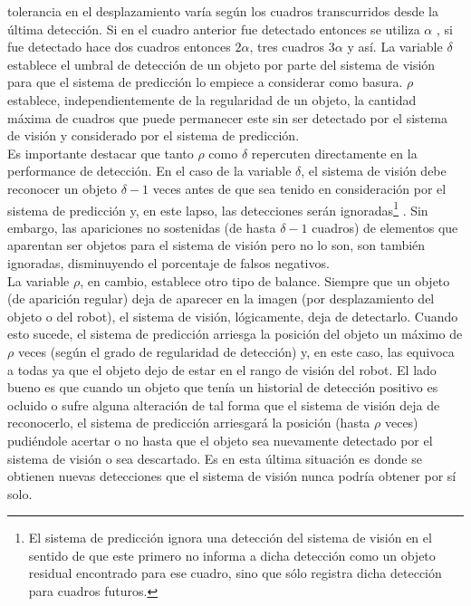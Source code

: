 tolerancia en el desplazamiento varía según los cuadros transcurridos desde la última 
detección. Si en el cuadro anterior fue detectado entonces se utiliza 
$\alpha$ , si fue detectado hace dos cuadros entonces $2\alpha$, tres 
cuadros $3\alpha$ y así. La variable $\delta$ establece el umbral de 
detección de un objeto por parte del sistema de visión para que el 
sistema de predicción lo empiece  a considerar como basura. $\rho$ establece, 
independientemente de la  
regularidad de un objeto, la cantidad máxima de cuadros que puede 
permanecer este sin ser detectado por el sistema de visión y 
considerado por el sistema de predicción. \\ 
\indent Es importante destacar que tanto $\rho$ como $\delta$ repercuten directamente en la 
performance de detección. En el caso de la variable $\delta$, el 
sistema de visión debe reconocer un objeto $\delta -1$ veces antes de que sea 
tenido en consideración por el sistema de predicción y, en este lapso, las 
detecciones serán ignoradas\footnote{El sistema de predicción ignora 
una detección del sistema de visión en el sentido de que este primero 
no informa a dicha detección como un objeto residual encontrado para 
ese cuadro, sino que sólo registra dicha detección para 
cuadros futuros.} . Sin embargo, las apariciones no sostenidas 
(de hasta $\delta -1$ cuadros) de elementos que aparentan ser objetos 
para el sistema de visión pero no lo son, son también ignoradas, 
disminuyendo el porcentaje de falsos negativos.\\
\indent La variable $\rho$, en cambio, establece otro tipo de balance. 
	Siempre que un objeto (de aparición regular) deja de aparecer en la imagen (por 
	desplazamiento del objeto o del robot), el sistema de visión, 
	lógicamente, deja de detectarlo. Cuando esto sucede, el sistema de 
	predicción arriesga la posición del objeto un máximo de $\rho$ veces 
	(según el grado de regularidad de detección) y, en este caso, las equivoca a 
	todas ya que el objeto dejo de estar en el rango de visión del 
	robot. El lado bueno es que cuando un objeto que tenía un historial de 
	detección positivo es ocluido o sufre alguna alteración de tal 
	forma que el sistema de visión deja de reconocerlo, el sistema de predicción 
	arriesgará la posición (hasta $\rho$ veces) pudiéndole acertar o no hasta que el objeto 
	sea nuevamente detectado por el sistema de visión o sea descartado. 
	Es en esta última situación es donde se obtienen nuevas detecciones que el sistema de visión 
	nunca podría obtener por sí solo.\\
